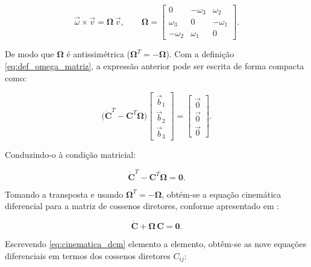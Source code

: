 \begin{equation}
\vec{\omega}\times\vec{v}
=
\boldsymbol{\Omega}\,\vec{v},
\qquad
\boldsymbol{\Omega}
=
\begin{bmatrix}
0      & -\omega_3 &  \omega_2 \\
\omega_3 & 0       & -\omega_1 \\
-\omega_2 & \omega_1 & 0
\end{bmatrix}.
\label{eq:def_omega_matriz}
\end{equation}

De modo que $\boldsymbol{\Omega}$ é antissimétrica ($\boldsymbol{\Omega}^{T} = -\boldsymbol{\Omega}$).
Com a definição \eqref{eq:def_omega_matriz}, a expressão anterior pode ser escrita de forma compacta como:

\begin{equation}
\big(\dot{\mathbf{C}}^{T} - \mathbf{C}^{T}\boldsymbol{\Omega}\big)
\begin{bmatrix}
\vec{b}_1 \\
\vec{b}_2 \\
\vec{b}_3
\end{bmatrix}
=
\begin{bmatrix}
\vec{0} \\
\vec{0} \\
\vec{0}
\end{bmatrix}.
\end{equation}

Conduzindo-o à condição matricial:

\begin{equation}
\dot{\mathbf{C}}^{T} - \mathbf{C}^{T}\boldsymbol{\Omega} = \mathbf{0}.
\end{equation}

Tomando a transposta e usando $\boldsymbol{\Omega}^{T} = -\boldsymbol{\Omega}$, obtém-se a equação cinemática diferencial para a matriz de cossenos diretores, conforme apresentado em \cite{wie2008space}:

\begin{equation}
\dot{\mathbf{C}} + \boldsymbol{\Omega}\,\mathbf{C} = \mathbf{0}.
\label{eq:cinematica_dcm}
\end{equation}


Escrevendo \eqref{eq:cinematica_dcm} elemento a elemento, obtêm-se as nove equações diferenciais em termos dos cossenos diretores $C_{ij}$:


